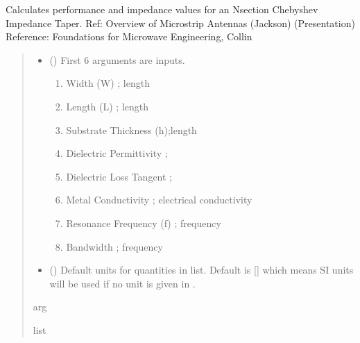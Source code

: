 \documentclass[letterpaper,10pt,english]{sphinxmanual}
\begin{document}
\begin{fulllineitems}
\label{\detokenize{components:components.Patch_Antenna_Analysis}}
\pysigstartsignatures
{}
\pysigstopsignatures
\sphinxAtStartPar
Calculates performance and impedance values for an N\sphinxhyphen{}section Chebyshev Impedance Taper.
Ref: Overview of Microstrip Antennas (Jackson) (Presentation)
Reference:  Foundations for Microwave Engineering, Collin
\begin{quote}\begin{description}
\begin{itemize}
\item {} 
\sphinxAtStartPar
{} () \textendash{} 
\sphinxAtStartPar
First 6 arguments are inputs.
\begin{enumerate}
%
\item {} 
\sphinxAtStartPar
Width (W) ; length

\item {} 
\sphinxAtStartPar
Length (L) ; length

\item {} 
\sphinxAtStartPar
Substrate Thickness (h);length

\item {} 
\sphinxAtStartPar
Dielectric Permittivity ;

\item {} 
\sphinxAtStartPar
Dielectric Loss Tangent ;

\item {} 
\sphinxAtStartPar
Metal Conductivity ; electrical conductivity

\item {} 
\sphinxAtStartPar
Resonance Frequency (f) ; frequency

\item {} 
\sphinxAtStartPar
Bandwidth ; frequency

\end{enumerate}


\item {} 
\sphinxAtStartPar
{} (\sphinxstyleliteralemphasis{\sphinxupquote{, }}) \textendash{} Default units for quantities in  list. Default is {[}{]} which means SI units will be used if no unit is given in .

\end{itemize}

\sphinxAtStartPar
arg

\sphinxAtStartPar
list

\end{description}\end{quote}

\end{fulllineitems}
\end{document}
